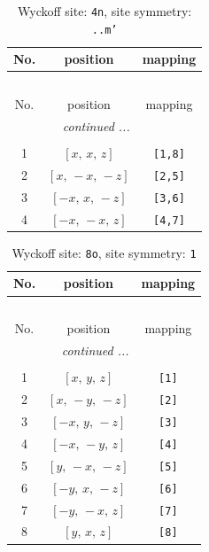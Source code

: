 \documentclass[fleqn,8pt]{jsarticle}
\begin{document}
\renewcommand{\arraystretch}{1.2}
\begin{longtable}{ccc}
\caption{Wyckoff site: {\tt 4n}, site symmetry: {\tt ..m'}}
 \\
 \hline \hline
No. & position & mapping \\ \hline \endfirsthead

\multicolumn{2}{l}{\tablename\ \thetable{}} \\
 \hline \hline
No. & position & mapping \\ \hline \endhead

 \hline \hline
\multicolumn{2}{r}{\footnotesize\it continued ...} \\ \endfoot

 \hline \hline
\multicolumn{2}{r}{} \\ \endlastfoot

1 & $\left[ x,\, x,\, z \right]$ & {\tt [1,8]} \\ \hline
2 & $\left[ x,\, - x,\, - z \right]$ & {\tt [2,5]} \\ \hline
3 & $\left[ - x,\, x,\, - z \right]$ & {\tt [3,6]} \\ \hline
4 & $\left[ - x,\, - x,\, z \right]$ & {\tt [4,7]} \\
\end{longtable}
\renewcommand{\arraystretch}{1.2}
\begin{longtable}{ccc}
\caption{Wyckoff site: {\tt 8o}, site symmetry: {\tt 1}}
 \\
 \hline \hline
No. & position & mapping \\ \hline \endfirsthead

\multicolumn{2}{l}{\tablename\ \thetable{}} \\
 \hline \hline
No. & position & mapping \\ \hline \endhead

 \hline \hline
\multicolumn{2}{r}{\footnotesize\it continued ...} \\ \endfoot

 \hline \hline
\multicolumn{2}{r}{} \\ \endlastfoot

1 & $\left[ x,\, y,\, z \right]$ & {\tt [1]} \\ \hline
2 & $\left[ x,\, - y,\, - z \right]$ & {\tt [2]} \\ \hline
3 & $\left[ - x,\, y,\, - z \right]$ & {\tt [3]} \\ \hline
4 & $\left[ - x,\, - y,\, z \right]$ & {\tt [4]} \\ \hline
5 & $\left[ y,\, - x,\, - z \right]$ & {\tt [5]} \\ \hline
6 & $\left[ - y,\, x,\, - z \right]$ & {\tt [6]} \\ \hline
7 & $\left[ - y,\, - x,\, z \right]$ & {\tt [7]} \\ \hline
8 & $\left[ y,\, x,\, z \right]$ & {\tt [8]} \\
\end{longtable}
\end{document}
